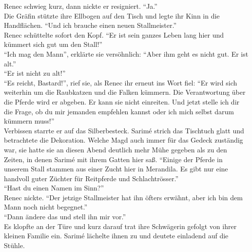 Renec schwieg kurz, dann nickte er resigniert. ``Ja.''\\
Die Gräfin stützte ihre Ellbogen auf den Tisch und legte ihr Kinn in die Handflächen. ``Und ich 
brauche einen neuen Stallmeister.''\\
Renec schüttelte sofort den Kopf. ``Er ist sein ganzes Leben lang hier und kümmert sich gut um 
den Stall!''\\
``Ich mag den Mann'', erklärte sie versöhnlich: ``Aber ihm geht es nicht gut. Er ist alt.''\\
``Er ist nicht zu alt!''\\
``Es reicht, Bastard!'', rief sie, als Renec ihr erneut ins Wort fiel: ``Er wird sich weiterhin um 
die Raubkatzen und die Falken kümmern. Die Verantwortung über die Pferde wird er abgeben. Er kann 
sie nicht einreiten. Und jetzt stelle ich dir die Frage, ob du mir jemanden empfehlen kannst oder 
ich mich selbst darum kümmern muss!''\\
Verbissen starrte er auf das Silberbesteck. Sarimé strich das Tischtuch glatt und betrachtete die 
Dekoration. Welche Magd auch immer für das Gedeck zuständig war, sie hatte sie an diesen Abend 
deutlich mehr Mühe gegeben als zu den Zeiten, in denen Sarimé mit ihrem Gatten hier saß. 
``Einige der Pferde in unserem Stall stammen aus einer Zucht hier in Merandila. Es gibt nur eine 
handvoll guter Züchter für Reitpferde und Schlachtrösser.''\\
``Hast du einen Namen im Sinn?''\\
Renec nickte. ``Der jetzige Stallmeister hat ihn öfters erwähnt, aber ich bin dem Mann noch nicht 
begegnet.''\\
``Dann ändere das und stell ihn mir vor.''\\
Es klopfte an der Türe und kurz darauf trat ihre Schwägerin gefolgt von ihrer kleinen Familie ein. 
Sarimé lächelte ihnen zu und deutete einladend auf die Stühle. \\


